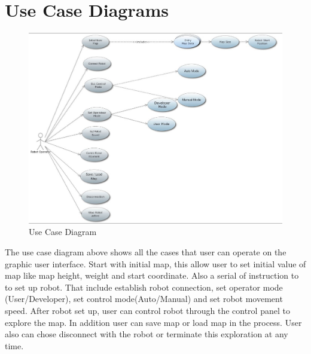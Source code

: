 \documentclass[11pt, a4paper]{report}
\begin{document}
\section{Use Case Diagrams}
\begin{figure}[h]
  \centering
    \includegraphics[width=16cm]{SEP_13_UseCase.jpg}
  \caption{Use Case Diagram}
\end{figure}

The use case diagram above shows all the cases that user can operate on the graphic user interface. Start with initial map, this allow user to set initial value of map like map height, weight and start coordinate. Also a serial of instruction to to set up robot. That include establish robot connection, set operator mode (User/Developer), set control mode(Auto/Manual) and set robot movement speed. After robot set up, user can control robot through the control panel to explore the map. In addition user can save map or load map in the process. User also can chose disconnect with the robot or terminate this exploration at any time.
\newpage
\end{document}
